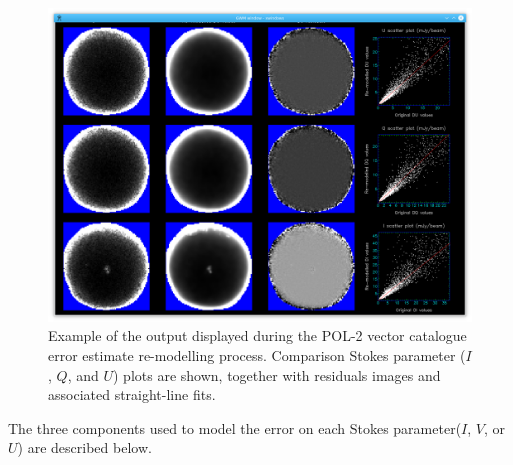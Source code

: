 \begin{figure}[ht!]
\begin{center}
\includegraphics[width=0.9\linewidth]{sc22-ophl1688-pol2noise-fitting-1.png}
\caption [Plotting Window produced During POL-2 Vector Catalogue Error
Estimate Remodelling for Oph L\,1688]{Example of the output displayed during the POL-2
vector catalogue error estimate re-modelling process. Comparison Stokes parameter
($I$, $Q$, and $U$) plots are shown, together with residuals images and associated
straight-line fits.
}
\label{fig:remodellingwindow}
\end{center}
\end{figure}

The three components used to model the error on each Stokes parameter($I$, $V$,
or $U$) are described below.

